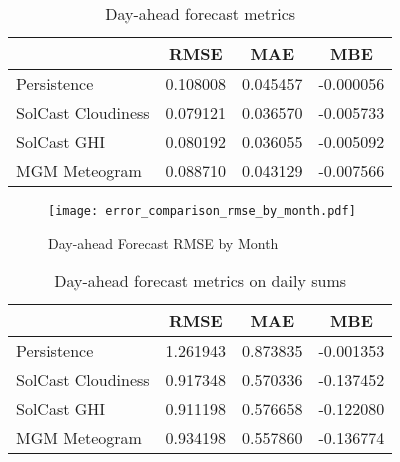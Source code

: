 \begin{table}[!t]
	\centering
	\caption{Day-ahead forecast metrics}
	\label{table:dayahead-metrics}
	\begin{tabular}{lS[table-format=1.3]S[table-format=1.3]>{}S[table-format=-1.4]}
		\toprule
		                       &   {RMSE}   &   {MAE}    &    {MBE}    \\
        \midrule
		Persistence & 0.108008 & 0.045457 & -0.000056 \\
		SolCast Cloudiness & 0.079121 & 0.036570 & -0.005733 \\
		SolCast GHI & 0.080192 & 0.036055 & -0.005092 \\
		MGM Meteogram & 0.088710 & 0.043129 & -0.007566 \\
		\bottomrule
	\end{tabular}
\end{table}

 

\begin{figure}[tbh]
	\centering
	\texttt{[image: error\_comparison\_rmse\_by\_month.pdf]}
	\caption{Day-ahead Forecast RMSE by Month}
	\label{fig:error-comparison-rmse-by-month}
\end{figure}

\begin{table}[!t]
	\centering
	\caption{Day-ahead forecast metrics on daily sums}
	\label{table:dayahead-metrics-sum}
	\begin{tabular}{lS[table-format=1.3]S[table-format=1.3]S[table-format=-1.3]}
		\toprule
		                       &   {RMSE}   &   {MAE}    &    {MBE}    \\
        \midrule
		Persistence & 1.261943 & 0.873835 & -0.001353 \\
		SolCast Cloudiness & 0.917348 & 0.570336 & -0.137452 \\
		SolCast GHI & 0.911198 & 0.576658 & -0.122080 \\
		MGM Meteogram & 0.934198 & 0.557860 & -0.136774 \\
		\bottomrule
	\end{tabular}
\end{table}


